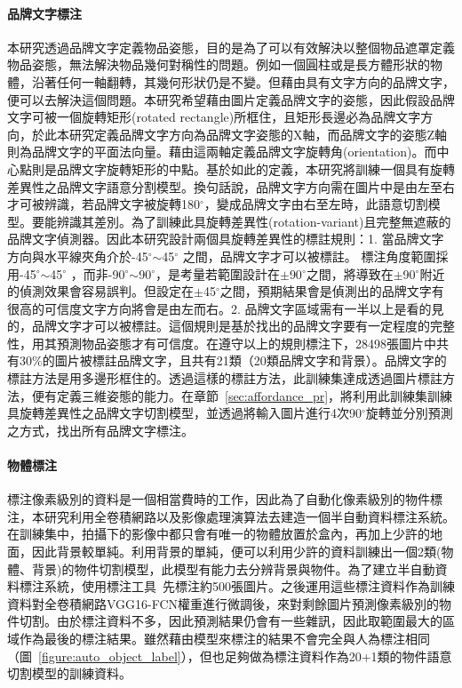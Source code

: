 \paragraph{品牌文字標注}
本研究透過品牌文字定義物品姿態，目的是為了可以有效解決以整個物品遮罩定義物品姿態，無法解決物品幾何對稱性的問題。例如一個圓柱或是長方體形狀的物體，沿著任何一軸翻轉，其幾何形狀仍是不變。但藉由具有文字方向的品牌文字，便可以去解決這個問題。本研究希望藉由圖片定義品牌文字的姿態，因此假設品牌文字可被一個旋轉矩形(rotated rectangle)所框住，且矩形長邊必為品牌文字方向，於此本研究定義品牌文字方向為品牌文字姿態的X軸，而品牌文字的姿態Z軸則為品牌文字的平面法向量。藉由這兩軸定義品牌文字旋轉角(orientation)。而中心點則是品牌文字旋轉矩形的中點。基於如此的定義，本研究將訓練一個具有旋轉差異性之品牌文字語意分割模型。換句話說，品牌文字方向需在圖片中是由左至右才可被辨識，若品牌文字被旋轉180$^{\circ}$，變成品牌文字由右至左時，此語意切割模型。要能辨識其差別。為了訓練此具旋轉差異性(rotation-variant)且完整無遮蔽的品牌文字偵測器。因此本研究設計兩個具旋轉差異性的標註規則：1. 當品牌文字方向與水平線夾角介於-45$^{\circ}$$\sim$45$^{\circ}$ 之間，品牌文字才可以被標註。
標注角度範圍採用-45$^{\circ}$$\sim$45$^{\circ}$ ，而非-90$^{\circ}$$\sim$90$^{\circ}$，是考量若範圍設計在$\pm$90$^{\circ}$之間，將導致在$\pm$90$^{\circ}$附近的偵測效果會容易誤判。但設定在$\pm$45$^{\circ}$之間，預期結果會是偵測出的品牌文字有很高的可信度文字方向將會是由左而右。2. 品牌文字區域需有一半以上是看的見的，品牌文字才可以被標註。這個規則是基於找出的品牌文字要有一定程度的完整性，用其預測物品姿態才有可信度。在遵守以上的規則標注下，28498張圖片中共有30\%的圖片被標註品牌文字，且共有21類（20類品牌文字和背景）。品牌文字的標註方法是用多邊形框住的。透過這樣的標註方法，此訓練集達成透過圖片標註方法，便有定義三維姿態的能力。在章節~\ref{sec:affordance_pr}，將利用此訓練集訓練具旋轉差異性之品牌文字切割模型，並透過將輸入圖片進行4次90$^{\circ}$旋轉並分別預測之方式，找出所有品牌文字標注。




\paragraph{物體標注}
標注像素級別的資料是一個相當費時的工作，因此為了自動化像素級別的物件標注，本研究利用全卷積網路以及影像處理演算法去建造一個半自動資料標注系統。在訓練集中，拍攝下的影像中都只會有唯一的物體放置於盒內，再加上少許的地面，因此背景較單純。利用背景的單純，便可以利用少許的資料訓練出一個2類(物體、背景)的物件切割模型，此模型有能力去分辨背景與物件。為了建立半自動資料標注系統，使用標注工具~\cite{russell2008labelme}先標注約500張圖片。之後運用這些標注資料作為訓練資料對全卷積網路VGG16-FCN權重進行微調後，來對剩餘圖片預測像素級別的物件切割。由於標注資料不多，因此預測結果仍會有一些雜訊，因此取範圍最大的區域作為最後的標注結果。雖然藉由模型來標注的結果不會完全與人為標注相同（圖~\ref{figure:auto_object_label}），但也足夠做為標注資料作為20+1類的物件語意切割模型的訓練資料。

